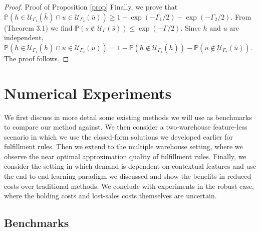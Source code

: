 \documentclass[poms,final,blindrev]{poms1_V1} %
\newcommand{\paren}[1]{\left( #1 \right)}
\begin{document}
\begin{proof}{Proof of Proposition \ref{prop}}
Finally, we prove that $\mathbb{P} \paren{h \in \mathcal{U}_{\Gamma_1}(\bar{h}) \cap u \in \mathcal{U}_{\Gamma_2}(\bar{u})} \geq 1 - \exp\paren{-\Gamma_1/2} - \exp\paren{-\Gamma_2/2}$. From \cite{bertsimas2022robust} (Theorem 3.1) we find $\mathbb{P} \paren{s \not\in \mathcal{U}_{\Gamma}(\bar{s})} \leq \exp\paren{-\Gamma/2}$. Since $h$ and $u$ are independent, $\mathbb{P} \paren{h \in \mathcal{U}_{\Gamma_1}(\bar{h}) \cap u \in \mathcal{U}_{\Gamma_2}(\bar{u})} = 1 - \mathbb{P} \paren{h \not\in \mathcal{U}_{\Gamma_1}(\bar{h})} - \mathbb{P} \paren{u \not\in \mathcal{U}_{\Gamma_2}(\bar{u})}$. The proof follows. 

\end{proof} 

\section{Numerical Experiments}

We first discuss in more detail some existing methods we will use as benchmarks to compare our method against. We then consider a two-warehouse feature-less scenario in which we use the closed-form solutions we developed earlier for fulfillment rules. Then we extend to the multiple warehouse setting, where we observe the near optimal approximation quality of fulfillment rules.  Finally, we consider the setting in which demand is dependent on contextual features and use the end-to-end learning paradigm we discussed and show the benefits in reduced costs over traditional methods. We conclude with experiments in the robust case, where the holding costs and lost-sales costs themselves are uncertain. 


\subsection{Benchmarks}

\end{document}
